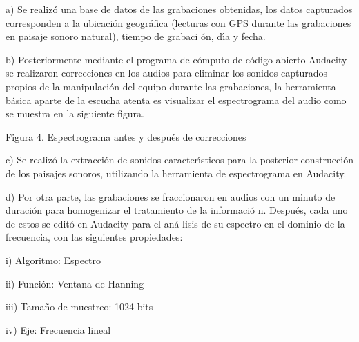 \qquad a) Se realiz\'{o} una base de datos de las grabaciones obtenidas, los
datos capturados corresponden a la ubicaci\'{o}n geogr\'{a}fica (lecturas
con GPS durante las grabaciones en paisaje sonoro natural), tiempo de grabaci%
\'{o}n, d\'{\i}a y fecha.

\qquad b) Posteriormente mediante el programa de c\'{o}mputo de c\'{o}digo
abierto Audacity se realizaron correcciones en los audios para eliminar los
sonidos capturados propios de la manipulaci\'{o}n del equipo durante las
grabaciones, la herramienta b\'{a}sica aparte de la escucha atenta es
visualizar el espectrograma del audio como se muestra en la siguiente figura.

\begin{center}

Figura 4. Espectrograma antes y despu\'{e}s de correcciones
\end{center}

\qquad c) Se realiz\'{o} la extracci\'{o}n de sonidos caracter\'{\i}sticos
para la posterior construcci\'{o}n de los paisajes sonoros, utilizando la
herramienta de espectrograma en Audacity.

\qquad d) Por otra parte, las grabaciones se fraccionaron en audios con un
minuto de duraci\'{o}n para homogenizar el tratamiento de la informaci\'{o}%
n. Despu\'{e}s, cada uno de estos se edit\'{o} en Audacity para el an\'{a}%
lisis de su espectro en el dominio de la frecuencia, con las siguientes
propiedades:

\qquad\qquad i) Algoritmo: Espectro

\qquad\qquad ii) Funci\'{o}n: Ventana de Hanning

\qquad\qquad iii) Tama\~{n}o de muestreo: 1024 bits

\qquad \qquad iv) Eje: Frecuencia lineal

